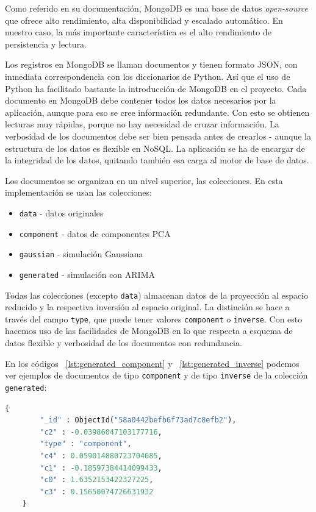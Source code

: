 \documentclass[11pt,spanish,listoffigures,listoftables]{tfgetsinf}
\begin{document}
        Como referido en su documentación, MongoDB es una base de datos {\em open-source} que ofrece alto rendimiento, alta disponibilidad y escalado automático. En nuestro caso, la más importante característica es el alto rendimiento de persistencia y lectura. 
        
        Los registros en MongoDB se llaman documentos y tienen formato JSON, con inmediata correspondencia con los diccionarios de Python. Así que el uso de Python ha facilitado bastante la introducción de MongoDB en el proyecto. Cada documento en MongoDB debe contener todos los datos necesarios por la aplicación, aunque para eso se cree información redundante. Con esto se obtienen lecturas muy rápidas, porque no hay necesidad de cruzar información. La verbosidad de los documentos debe ser bien pensada antes de crearlos - aunque la estructura de los datos es flexible en NoSQL. La aplicación se ha de encargar de la integridad de los datos, quitando también esa carga al motor de base de datos.
        
        Los documentos se organizan en un nivel superior, las colecciones. En esta implementación se usan las colecciones:
        \begin{itemize}
        \item {\tt data} - datos originales
        \item {\tt component} - datos de componentes PCA
        \item {\tt gaussian} - simulación Gaussiana
        \item {\tt generated} - simulación con ARIMA
        \end{itemize}
        
        Todas las colecciones (excepto {\tt data}) almacenan datos de la proyección al espacio reducido y la respectiva inversión al espacio original. La distinción se hace a través del campo {\tt type}, que puede tener valores {\tt component} o {\tt inverse}. Con esto hacemos uso de las facilidades de MongoDB en lo que respecta a esquema de datos flexible y verbosidad de los documentos con redundancia. 
        
        En los códigos ~\ref{lst:generated_component} y ~\ref{lst:generated_inverse} podemos ver ejemplos de documentos de tipo {\tt component} y de tipo {\tt inverse} de la colección {\tt generated}:
        \begin{lstlisting}[language=Python, caption=Documento de tipo {\tt component}., label={lst:generated_component}]
    {
        "_id" : ObjectId("58a0442befb6f73ad7c8efb2"),
        "c2" : -0.03986047103177716,
        "type" : "component",
        "c4" : 0.059014880723704685,
        "c1" : -0.18597384414099433,
        "c0" : 1.6352153422327225,
        "c3" : 0.15650074726631932
    }
        \end{lstlisting}
\end{document}
